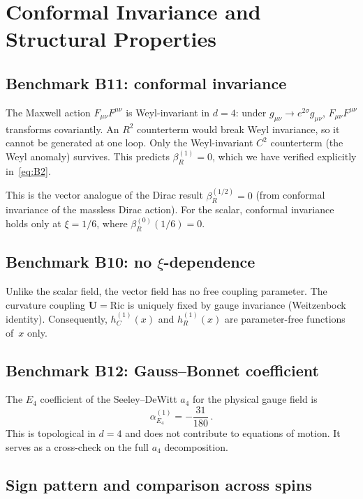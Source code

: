 \documentclass[11pt,a4paper]{article}
\theoremstyle{definition}
\theoremstyle{remark}
\begin{document}
\section{Conformal Invariance and Structural Properties}
\label{sec:conformal}

\subsection{Benchmark B11: conformal invariance}

The Maxwell action $F_{\mu\nu}F^{\mu\nu}$ is Weyl-invariant
in $d = 4$: under $g_{\mu\nu} \to e^{2\sigma}g_{\mu\nu}$,
$F_{\mu\nu}F^{\mu\nu}$ transforms covariantly.
An $R^2$ counterterm would break Weyl invariance, so it cannot
be generated at one loop.  Only the Weyl-invariant $C^2$ counterterm
(the Weyl anomaly) survives.  This predicts $\beta_R^{(1)} = 0$,
which we have verified explicitly in~\eqref{eq:B2}.

This is the vector analogue of the Dirac result
$\beta_R^{(1/2)} = 0$ (from conformal invariance of the massless
Dirac action).  For the scalar, conformal invariance holds only
at $\xi = 1/6$, where $\beta_R^{(0)}(1/6) = 0$.

\subsection{Benchmark B10: no $\xi$-dependence}

Unlike the scalar field, the vector field has no free coupling
parameter.  The curvature coupling $\mathbf{U} = \mathrm{Ric}$
is uniquely fixed by gauge invariance (Weitzenbock identity).
Consequently, $h_C^{(1)}(x)$ and $h_R^{(1)}(x)$ are parameter-free
functions of~$x$ only.

\subsection{Benchmark B12: Gauss--Bonnet coefficient}

The $E_4$ coefficient of the Seeley--DeWitt $a_4$ for the physical
gauge field is
\begin{equation}
  \alpha_{E_4}^{(1)} = -\frac{31}{180}\,.
  \label{eq:B12}
\end{equation}
This is topological in $d = 4$ and does not contribute to
equations of motion.  It serves as a cross-check on the full
$a_4$ decomposition.

\subsection{Sign pattern and comparison across spins}
\end{document}
